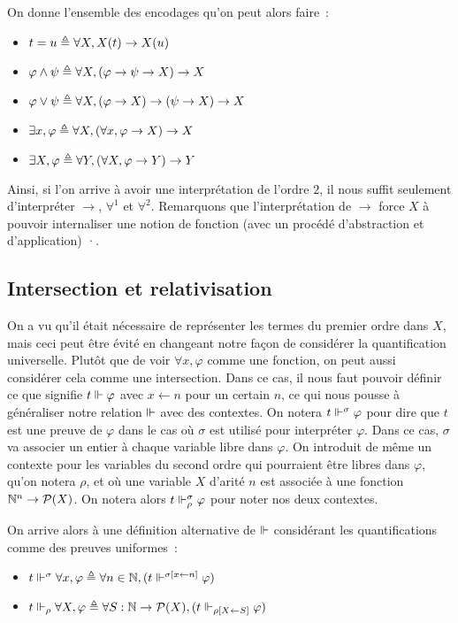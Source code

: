 \documentclass{article}
\begin{document}
On donne l'ensemble des encodages qu'on peut alors faire~:
\begin{itemize}
\item $t = u \triangleq \forall X, X(t) \to X(u)$
\item $\varphi\land \psi \triangleq \forall X, (\varphi \to \psi \to X) \to X$
\item $\varphi \lor \psi \triangleq \forall X, (\varphi \to X) \to (\psi \to X) \to X$
\item $\exists x, \varphi \triangleq \forall X, (\forall x, \varphi \to X) \to X$
\item $\exists X, \varphi \triangleq \forall Y, (\forall X, \varphi \to Y) \to Y$
\end{itemize}

Ainsi, si l'on arrive à avoir une interprétation de l'ordre $2$, il nous suffit seulement d'interpréter $\to$, $\forall^1$ et $\forall^2$. Remarquons que l'interprétation de $\to$  force $X$ à pouvoir internaliser une notion de fonction (avec un procédé d'abstraction et d'application) ·.

\subsection{Intersection et relativisation}

On a vu qu'il était nécessaire de représenter les termes du premier ordre dans $X$, mais ceci peut être évité en changeant notre façon de considérer la quantification universelle. Plutôt que de voir $\forall x, \varphi$ comme une fonction, on peut aussi considérer cela comme une intersection. Dans ce cas, il nous faut pouvoir définir ce que signifie $t\Vdash\varphi$ avec $x\leftarrow n$ pour un certain $n$, ce qui nous pousse à généraliser notre relation $\Vdash$ avec des contextes. On notera $t\Vdash^\sigma \varphi$ pour dire que $t$ est une preuve de $\varphi$ dans le cas où $\sigma$ est utilisé pour interpréter $\varphi$. Dans ce cas, $\sigma$ va associer un entier à chaque variable libre dans $\varphi$. On introduit de même un contexte pour les variables du second ordre qui pourraient être libres dans $\varphi$, qu'on notera $\rho$, et où une variable $X$ d'arité $n$ est associée à une fonction $\mathbb{N}^n \to \mathcal P(X)$. On notera alors $t\Vdash_\rho^\sigma \varphi$ pour noter nos deux contextes.

On arrive alors à une définition alternative de $\Vdash$ considérant les quantifications comme des preuves uniformes~:
\begin{itemize}
\item $t\Vdash^\sigma \forall x,\varphi \triangleq \forall n \in \mathbb{N}, (t\Vdash^{\sigma[x \leftarrow n]} \varphi)$
\item $t\Vdash_\rho \forall X, \varphi \triangleq \forall S : \mathbb{N} \to \mathcal P(X), (t\Vdash_{\rho[X\leftarrow S]}\varphi)$
\end{itemize}
\end{document}
